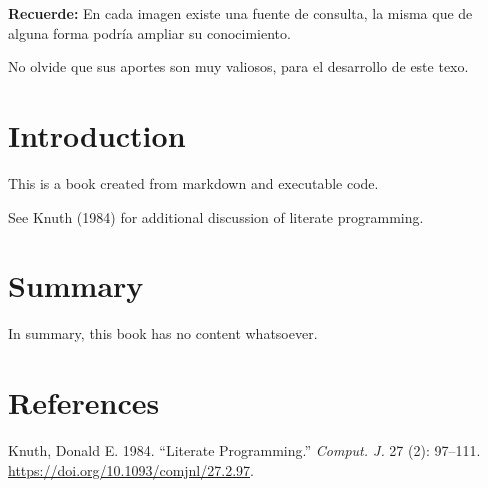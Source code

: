 \documentclass[
  letterpaper,
  DIV=11,
  numbers=noendperiod]{scrreprt}
\newlength{\cslhangindent}
\newenvironment{CSLReferences}[2] %
 {\begin{list}{}{%
  \setlength{\itemindent}{0pt}
  \setlength{\leftmargin}{0pt}
  \setlength{\parsep}{0pt}
  \ifodd #1
   \setlength{\leftmargin}{\cslhangindent}
   \setlength{\itemindent}{-1\cslhangindent}
  \fi
  \setlength{\itemsep}{#2\baselineskip}}}
 {\end{list}}
\begin{document}
\textbf{Recuerde:} En cada imagen existe una fuente de consulta, la
misma que de alguna forma podría ampliar su conocimiento.

No olvide que sus aportes son muy valiosos, para el desarrollo de este
texo.


\chapter{Introduction}\label{introduction}

This is a book created from markdown and executable code.

See Knuth (1984) for additional discussion of literate programming.


\chapter{Summary}\label{summary}

In summary, this book has no content whatsoever.


\chapter*{References}\label{references}


\label{refs}
\begin{CSLReferences}{1}{0}
Knuth, Donald E. 1984. {``Literate Programming.''} \emph{Comput. J.} 27
(2): 97--111. \url{https://doi.org/10.1093/comjnl/27.2.97}.

\end{CSLReferences}
\end{document}
